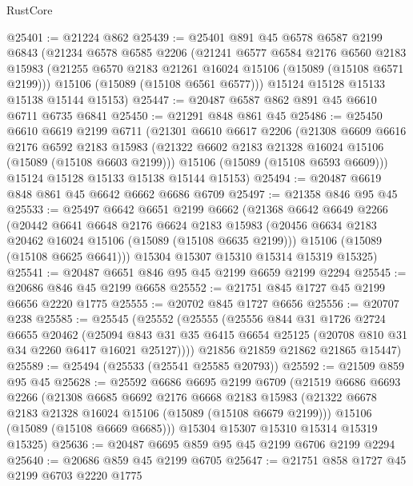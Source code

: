\begin{lexlean}{RustCore}
\begin{coremodule}
@25401 := @21224 @862
@25439 := @25401
    @891
    @45
    @6578
    @6587
    @2199
    @6843
    (@21234
      @6578
      @6585
      @2206
      (@21241
        @6577
        @6584
        @2176
        @6560
        @2183
        @15983
        (@21255 @6570 @2183 @21261 @16024 @15106 (@15089 (@15108 @6571 @2199)))
        @15106
        (@15089 (@15108 @6561 @6577)))
      @15124
      @15128
      @15133
      @15138
      @15144
      @15153)
@25447 := @20487 @6587 @862 @891 @45 @6610 @6711 @6735 @6841
@25450 := @21291 @848 @861 @45
@25486 := @25450
    @6610
    @6619
    @2199
    @6711
    (@21301
      @6610
      @6617
      @2206
      (@21308
        @6609
        @6616
        @2176
        @6592
        @2183
        @15983
        (@21322 @6602 @2183 @21328 @16024 @15106 (@15089 (@15108 @6603 @2199)))
        @15106
        (@15089 (@15108 @6593 @6609)))
      @15124
      @15128
      @15133
      @15138
      @15144
      @15153)
@25494 := @20487 @6619 @848 @861 @45 @6642 @6662 @6686 @6709
@25497 := @21358 @846 @95 @45
@25533 := @25497
    @6642
    @6651
    @2199
    @6662
    (@21368
      @6642
      @6649
      @2266
      (@20442
        @6641
        @6648
        @2176
        @6624
        @2183
        @15983
        (@20456 @6634 @2183 @20462 @16024 @15106 (@15089 (@15108 @6635 @2199)))
        @15106
        (@15089 (@15108 @6625 @6641)))
      @15304
      @15307
      @15310
      @15314
      @15319
      @15325)
@25541 := @20487 @6651 @846 @95 @45 @2199 @6659 @2199 @2294
@25545 := @20686 @846 @45 @2199 @6658
@25552 := @21751 @845 @1727 @45 @2199 @6656 @2220 @1775
@25555 := @20702 @845 @1727 @6656
@25556 := @20707 @238
@25585 := @25545
    (@25552
      (@25555
        (@25556
          @844
          @31
          @1726
          @2724
          @6655
          @20462
          (@25094 @843 @31 @35 @6415 @6654 @25125 (@20708 @810 @31 @34 @2260 @6417 @16021 @25127))))
      @21856
      @21859
      @21862
      @21865
      @15447)
@25589 := @25494 (@25533 (@25541 @25585 @20793))
@25592 := @21509 @859 @95 @45
@25628 := @25592
    @6686
    @6695
    @2199
    @6709
    (@21519
      @6686
      @6693
      @2266
      (@21308
        @6685
        @6692
        @2176
        @6668
        @2183
        @15983
        (@21322 @6678 @2183 @21328 @16024 @15106 (@15089 (@15108 @6679 @2199)))
        @15106
        (@15089 (@15108 @6669 @6685)))
      @15304
      @15307
      @15310
      @15314
      @15319
      @15325)
@25636 := @20487 @6695 @859 @95 @45 @2199 @6706 @2199 @2294
@25640 := @20686 @859 @45 @2199 @6705
@25647 := @21751 @858 @1727 @45 @2199 @6703 @2220 @1775

\end{coremodule}
\end{lexlean}
